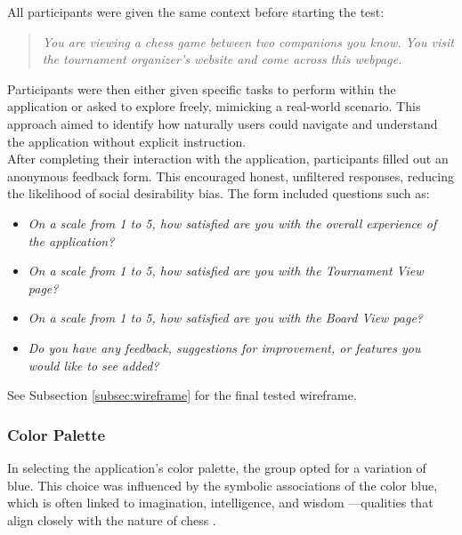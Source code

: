 All participants were given the same context before starting the test: 

\begin{quote}
\textit{You are viewing a chess game between two companions you know. You visit the tournament organizer's website and come across this webpage.}
\end{quote}

Participants were then either given specific tasks to perform within the application or asked to explore freely, mimicking a real-world scenario. This approach aimed to identify how naturally users could navigate and understand the application without explicit instruction. \\

After completing their interaction with the application, participants filled out an anonymous feedback form. This encouraged honest, unfiltered responses, reducing the likelihood of social desirability bias. The form included questions such as:

\begin{itemize}
    \item \textit{On a scale from 1 to 5, how satisfied are you with the overall experience of the application?}
    \item \textit{On a scale from 1 to 5, how satisfied are you with the Tournament View page?}
    \item \textit{On a scale from 1 to 5, how satisfied are you with the Board View page?}
    \item \textit{Do you have any feedback, suggestions for improvement, or features you would like to see added?}
\end{itemize}

See Subsection \ref{subsec:wireframe} for the final tested wireframe.

\newpage

\subsubsection*{Color Palette}
\label{subsubsec:color-palette}

In selecting the application's color palette, the group opted for a variation of blue. This choice was influenced by the symbolic associations of the color blue, which is often linked to imagination, intelligence, and wisdom \cite{blue}—qualities that align closely with the nature of chess \cite{chess:ppqty, chess:chess-and-creativity}. \\

